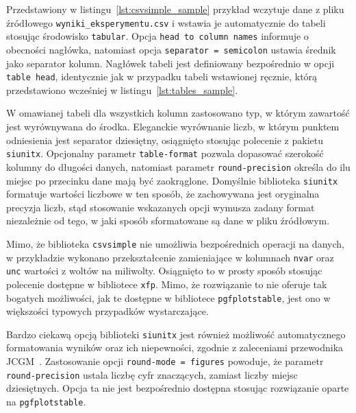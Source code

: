 \begin{listing}[p]
\inputminted{latex}{skrypty/csvsimple_sample.tex}
\end{listing}

Przedstawiony w listingu~\ref{lst:csvsimple_sample} przykład wczytuje dane z pliku źródłowego \verb|wyniki_eksperymentu.csv| i wstawia je automatycznie do tabeli stosując środowisko \texttt{tabular}. Opcja \verb|head to column names| informuje o obecności nagłówka, natomiast opcja \verb|separator = semicolon| ustawia średnik jako separator kolumn. Nagłówek tabeli jest definiowany bezpośrednio w opcji \verb|table head|, identycznie jak w przypadku tabeli wstawionej ręcznie, którą przedstawiono wcześniej w listingu~\ref{lst:tables_sample}.

W omawianej tabeli dla wszystkich kolumn zastosowano typ, w którym zawartość jest wyrównywana do środka. Eleganckie wyrównanie liczb, w którym punktem odniesienia jest separator dziesiętny, osiągnięto stosując polecenie \texttt{\tablenum} z pakietu \texttt{siunitx}. Opcjonalny parametr \verb|table-format| pozwala dopasować szerokość kolumny do długości danych, natomiast parametr \verb|round-precision| określa do ilu miejsc po przecinku dane mają być zaokrąglone. Domyślnie biblioteka \texttt{siunitx} formatuje wartości liczbowe w ten sposób, że zachowywana jest oryginalna precyzja liczb, stąd stosowanie wskazanych opcji wymusza zadany format niezależnie od tego, w jaki sposób sformatowane są dane w pliku źródłowym.

Mimo, że biblioteka \texttt{csvsimple} nie umożliwia bezpośrednich operacji na danych, w przykładzie wykonano przekształcenie zamieniające w kolumnach \texttt{nvar} oraz \texttt{unc} wartości z woltów na miliwolty. Osiągnięto to w prosty sposób stosując polecenie \texttt{\fpeval} dostępne w bibliotece \texttt{xfp}. Mimo, że rozwiązanie to nie oferuje tak bogatych możliwości, jak te dostępne w bibliotece \texttt{pgfplotstable}, jest ono w większości typowych przypadków wystarczające.

Bardzo ciekawą opcją biblioteki \texttt{siunitx} jest również możliwość automatycznego formatowania wyników oraz ich niepewności, zgodnie z zaleceniami przewodnika JCGM~\cite{jcgm_guide}. Zastosowanie opcji \verb|round-mode = figures| powoduje, że parametr \verb|round-precision| ustala liczbę cyfr znaczących, zamiast liczby miejsc dziesiętnych. Opcja ta nie jest bezpośrednio dostępna stosując rozwiązanie oparte na \texttt{pgfplotstable}.

